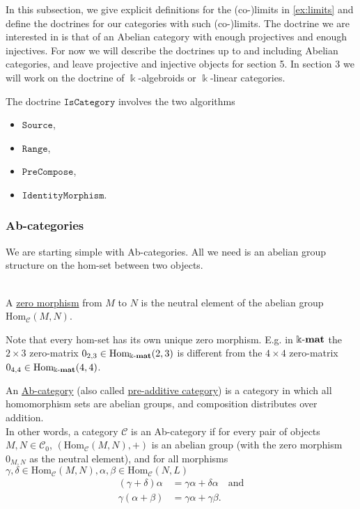 In this subsection, we give explicit definitions for the (co-)limits in \ref{ex:limits} and define the
doctrines for our categories with such (co-)limits. The doctrine we are interested in is that of an Abelian category with
enough projectives and enough injectives. For now we will describe the doctrines up to and including Abelian categories, and
leave projective and injective objects for section 5. In section 3 we will work on the doctrine of $\Bbbk$-algebroids or $\Bbbk$-linear
categories.

\begin{doctrine}[Category]\label{doc:category}
The doctrine $\mathtt{IsCategory}$ involves the two algorithms
\begin{itemize}
\item $\mathtt{Source}$,
\item $\mathtt{Range}$,
\item $\mathtt{PreCompose}$,
\item $\mathtt{IdentityMorphism}$.
\end{itemize}
\end{doctrine}


\subsubsection{Ab-categories}
We are starting simple with Ab-categories. All we need is an abelian group structure on the hom-set between two objects.

\begin{definition}\label{def:zero_morphism}\phantom{}\\
A \ul{zero morphism} from $M$ to $N$ is the neutral element of the abelian group $\mathrm{Hom}_{\mathcal{C}}(M,N)$.
\end{definition}
Note that every hom-set has its own unique zero morphism. E.g. in $\Bbbk\textnormal{-}\mathbf{mat}$ the $2 \times 3$ zero-matrix
$0_{2,3} \in \textup{Hom}_{\Bbbk\textnormal{-}\mathbf{mat}}(2,3)$ is different from the $4 \times 4$ zero-matrix $0_{4,4} \in \textup{Hom}_{\Bbbk\textnormal{-}\mathbf{mat}}(4,4)$.

\begin{definition}[Ab-category]
An \ul{Ab-category} (also called \ul{pre-additive category}) is a category in which all homomorphism sets are abelian groups,
and composition distributes over addition.\\
In other words, a category $\mathcal{C}$ is an Ab-category if for every pair of objects $M,N \in \mathcal{C}_{0}$,
$( \mathrm{Hom}_{\mathcal{C}}(M,N), + )$ is an abelian group (with the zero morphism $0_{M,N}$ as the neutral element),
and for all morphisms $\gamma, \delta \in \mathrm{Hom}_{\mathcal{C}}(M,N),
\alpha, \beta \in \mathrm{Hom}_{\mathcal{C}}(N,L)$
\begin{align}
(\gamma + \delta)\alpha &=\label{eq:dist1} \gamma\alpha + \delta\alpha\quad \mathrm{ and }\\
\gamma(\alpha+\beta) &=\label{eq:dist2} \gamma\alpha + \gamma\beta.
\end{align}
\end{definition}

